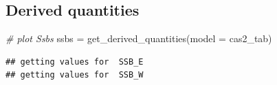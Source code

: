 \documentclass[
]{book}
\newenvironment{Shaded}{\begin{snugshade}}{\end{snugshade}}
\newcommand{\AttributeTok}[1]{\textcolor[rgb]{0.77,0.63,0.00}{#1}}
\newcommand{\CommentTok}[1]{\textcolor[rgb]{0.56,0.35,0.01}{\textit{#1}}}
\newcommand{\FunctionTok}[1]{\textcolor[rgb]{0.00,0.00,0.00}{#1}}
\newcommand{\NormalTok}[1]{#1}
\newcommand{\OtherTok}[1]{\textcolor[rgb]{0.56,0.35,0.01}{#1}}
\begin{document}
\hypertarget{derived-quantities-1}{%
\subsection{Derived quantities}\label{derived-quantities-1}}

\begin{Shaded}
\begin{Highlighting}[]
\CommentTok{\# plot Ssbs}
\NormalTok{ssbs }\OtherTok{=} \FunctionTok{get\_derived\_quantities}\NormalTok{(}\AttributeTok{model =}\NormalTok{ cas2\_tab)}
\end{Highlighting}
\end{Shaded}

\begin{verbatim}
## getting values for  SSB_E 
## getting values for  SSB_W
\end{verbatim}
\end{document}
